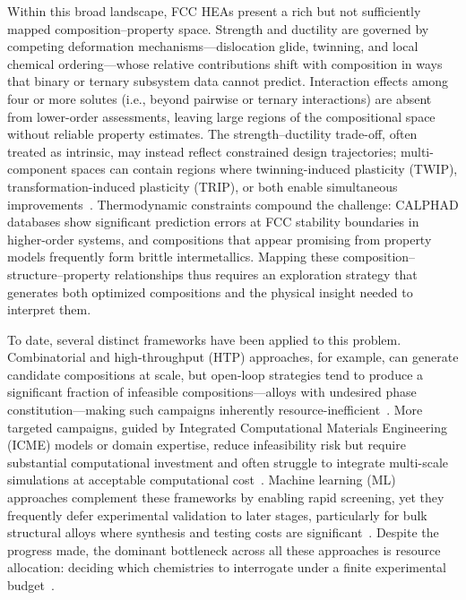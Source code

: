 \documentclass[preprint,12pt,times]{elsarticle}  %
\begin{document}
Within this broad landscape, FCC HEAs present a rich but not sufficiently mapped composition--property space. Strength and ductility are governed by competing deformation mechanisms---dislocation glide, twinning, and local chemical ordering---whose relative contributions shift with composition in ways that binary or ternary subsystem data cannot predict. Interaction effects among four or more solutes (i.e., beyond pairwise or ternary interactions) are absent from lower-order assessments, leaving large regions of the compositional space without reliable property estimates. The strength--ductility trade-off, often treated as intrinsic, may instead reflect constrained design trajectories; multi-component spaces can contain regions where twinning-induced plasticity (TWIP), transformation-induced plasticity (TRIP), or both enable simultaneous improvements~\cite{gludovatz2014fracture, li2016metastable, otto2013influences}. Thermodynamic constraints compound the challenge: CALPHAD databases show significant prediction errors at FCC stability boundaries in higher-order systems, and compositions that appear promising from property models frequently form brittle intermetallics. Mapping these composition--structure--property relationships thus requires an exploration strategy that generates both optimized compositions and the physical insight needed to interpret them.


To date, several distinct frameworks have been applied to this problem. Combinatorial and high-throughput (HTP) approaches, for example, can generate candidate compositions at scale, but open-loop strategies tend to produce a significant fraction of infeasible compositions---alloys with undesired phase constitution---making such campaigns inherently resource-inefficient~\cite{potyrailo2011combinatorial, rajan2008combinatorial}. More targeted campaigns, guided by Integrated Computational Materials Engineering (ICME) models or domain expertise, reduce infeasibility risk but require substantial computational investment and often struggle to integrate multi-scale simulations at acceptable computational cost~\cite{national2008integrated, panchal2013key, arroyave2019systems}. Machine learning (ML) approaches complement these frameworks by enabling rapid screening, yet they frequently defer experimental validation to later stages, particularly for bulk structural alloys where synthesis and testing costs are significant~\cite{yang2022machine}. Despite the progress made, the dominant bottleneck across all these approaches is resource allocation: deciding which chemistries to interrogate under a finite experimental budget~\cite{arroyave2022perspective}.
\end{document}
